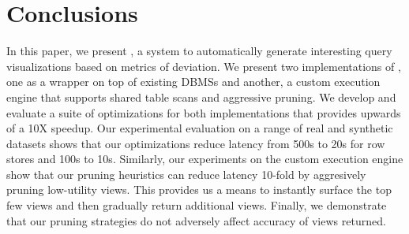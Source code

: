 
\section{Conclusions}
\label{sec:conc}

In this paper, we present \SeeDB, a system to automatically generate interesting
query visualizations based on metrics of deviation.
We present two implementations of \SeeDB, one as a wrapper on top of existing
DBMSs and another, a custom execution engine that supports shared table scans
and aggressive pruning.
We develop and evaluate a suite of optimizations for both implementations that
provides upwards of a 10X speedup.
Our experimental evaluation on a range of real and synthetic datasets shows that
our optimizations reduce latency from 500s to 20s for row stores and 100s to
10s.
Similarly, our experiments on the custom execution engine show that our pruning
heuristics can reduce latency 10-fold by aggresively pruning low-utility views.
This provides us a means to instantly surface the top few views and then
gradually return additional views.
Finally, we demonstrate that our pruning
strategies do not adversely affect accuracy of views returned.
